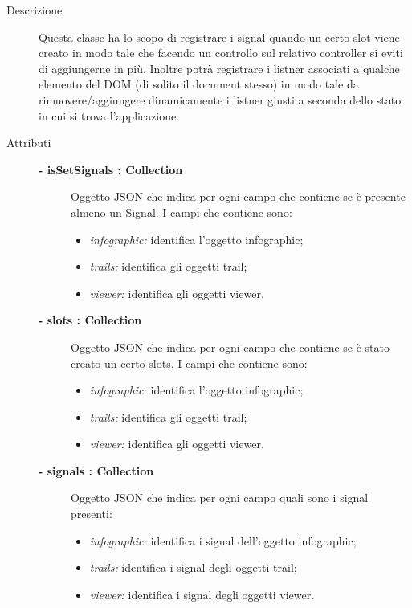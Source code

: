 \begin{description}
\item[Descrizione] \hfill
	Questa classe ha lo scopo di registrare i signal quando un certo slot viene creato in modo tale che facendo un controllo sul relativo controller si eviti di aggiungerne in più.
Inoltre potrà registrare i listner associati a qualche elemento del DOM (di solito il document stesso) in modo tale da rimuovere/aggiungere dinamicamente i listner giusti a seconda dello stato in cui si trova l'applicazione.
	
\item[Attributi] \hfill
	\begin{description}
		\item[\textbf{- isSetSignals : Collection			}] \hfill
			Oggetto JSON che indica per ogni campo che contiene se è presente almeno un Signal. I campi che contiene sono:
			\begin{itemize}
				\item \textit{infographic:} identifica l'oggetto infographic;
				\item \textit{trails:} identifica gli oggetti trail;
				\item \textit{viewer:} identifica gli oggetti viewer.  
			\end{itemize} 
		\item[\textbf{- slots : Collection			}] \hfill
			Oggetto JSON che indica per ogni campo che contiene se è stato creato un certo slots. I campi che contiene sono:
			\begin{itemize}
				\item \textit{infographic:} identifica l'oggetto infographic;
				\item \textit{trails:} identifica gli oggetti trail;
				\item \textit{viewer:} identifica gli oggetti viewer.  
			\end{itemize} 
		\item[\textbf{- signals : Collection			}] \hfill
			Oggetto JSON che indica per ogni campo quali sono i signal presenti:
			\begin{itemize}
				\item \textit{infographic:} identifica i signal dell'oggetto infographic;
				\item \textit{trails:} identifica i signal degli oggetti trail;
				\item \textit{viewer:} identifica i signal degli oggetti viewer.  
			\end{itemize} 
	\end{description}
	

\end{description}
